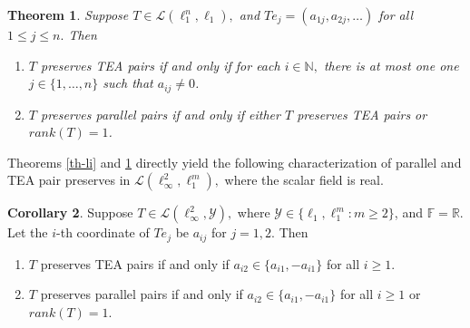 \documentclass{amsart}
\newtheorem{theorem}{Theorem}[section]
\theoremstyle{definition}
\newtheorem{cor}[theorem]{Corollary}
\theoremstyle{remark}
\numberwithin{equation}{section}
\begin{document}
\begin{theorem}\label{th-linf}
	Suppose $T\in \mathcal{L}(\ell_1^n,\ell_1),$ and $Te_j=(a_{1j},a_{2j},\ldots)$ for all $1\leq j\leq n.$ Then 
	\begin{enumerate}
		\item $T$ preserves TEA pairs if and only if for each $i\in \mathbb{N},$ there is at most one one $j\in \{1,\ldots,n\}$ such that $a_{ij}\neq 0$.
		\item 	$T$ preserves parallel pairs if and only if either $T$ preserves TEA pairs  or $rank(T)=1$.
	\end{enumerate}		
	\end{theorem}

 Theorems \ref{th-li} and \ref{th-linf} directly yield the following characterization  of parallel and TEA pair preserves in $\mathcal{L}(\ell_\infty^2,\ell_1^m),$ where the scalar field is real. 
\begin{cor}\label{cor-n2}
	Suppose $T\in\mathcal{L}(\ell_\infty^2,\mathcal{Y}),$ where $\mathcal{Y}\in \{\ell_1,\ell_1^m:m\geq 2\}$, and $\mathbb{F}=\mathbb{R}.$ Let the $i$-th coordinate of $Te_j$ be $a_{ij}$ for  $j=1,2.$ Then 
	\begin{enumerate}
		\item $T$ preserves TEA pairs if and only if $a_{i2}\in \{a_{i1},-a_{i1}\}$ for all $i\geq 1.$
		\item 	$T$ preserves parallel pairs if and only if $a_{i2}\in \{a_{i1},-a_{i1}\}$ for all $i\geq 1$ or $rank(T)=1$.
	\end{enumerate}	
\end{cor}
\end{document}
